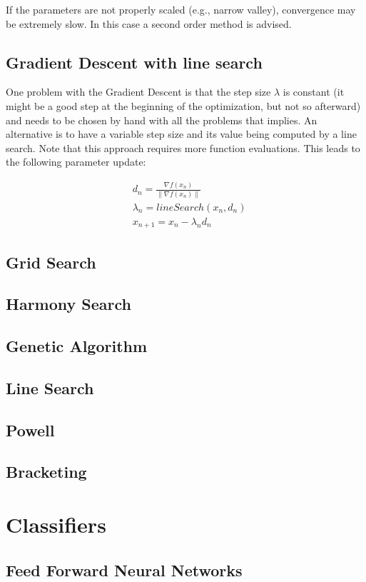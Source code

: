 \documentclass[11pt]{article}
\begin{document}
If the parameters are not properly scaled (e.g., narrow valley), convergence may be extremely slow. In this case a second order method is advised.

\subsection{Gradient Descent with line search}
One problem with the Gradient Descent is that the step size $\lambda$ is constant (it might be a good step at the beginning of the optimization, but not so afterward) and needs to be chosen by hand with all the problems that implies. An alternative is to have a variable step size and its value being computed by a line search. Note that this approach requires more function evaluations. This leads to the following parameter update:

\begin{align}
& d_n = \frac{\nabla{f}(x_n)}{\lVert \nabla{f}(x_n) \lVert} \nonumber\\
& \lambda_n = lineSearch(x_n, d_n) \nonumber\\
& x_{n+1} = x_n - \lambda _n d_n
\end{align}

\subsection{Grid Search}
\subsection{Harmony Search}
\subsection{Genetic Algorithm}
\subsection{Line Search}
\subsection{Powell}
\subsection{Bracketing}

\section{Classifiers}
\subsection{Feed Forward Neural Networks}
\end{document}
